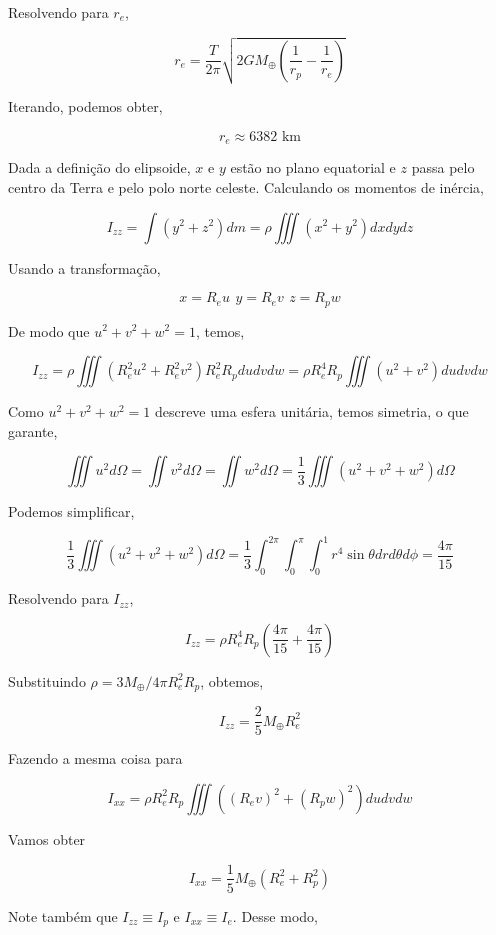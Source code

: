 \documentclass[11pt]{article}
\begin{document}
\begin{pproblem}
\begin{pssolution*}{}{}
\begin{alternativas}
            Resolvendo para \(r_e\), 

            \[r_e = \frac{T}{2\pi}\sqrt{2GM_\oplus\left(\frac{1}{r_p}-\frac{1}{r_e}\right)}\]

            Iterando, podemos obter, 

            \[r_e \approx 6382 \text{ km}\]

            \item Dada a definição do elipsoide, \(x\) e \(y\) estão no plano equatorial e \(z\) passa pelo centro da Terra e pelo polo norte celeste. Calculando os momentos de inércia, 
            
            \[I_{zz} = \int(y^2+z^2)dm = \rho \iiint (x^2+y^2)dxdydz\]

            Usando a transformação, 

            \[x = R_e u \, \ y = R_e v \, \ z = R_p w\]

            De modo que \(u^2+v^2+w^2=1\), temos, 

            \[I_{zz} = \rho\iiint (R_e^2u^2+R_e^2v^2) R_e^2R_pdudvdw = \rho R_e^4R_p \iiint (u^2+v^2)dudvdw\]

            Como \(u^2+v^2+w^2=1\) descreve uma esfera unitária, temos simetria, o que garante, 

            \[\iiint u^2d\Omega = \iint v^2d\Omega = \iint w^2d\Omega = \frac{1}{3}\iiint(u^2+v^2+w^2)d\Omega\]

            Podemos simplificar, 

            \[\frac{1}{3}\iiint(u^2+v^2+w^2)d\Omega = \frac{1}{3}\int_0^{2\pi}\int_{0}^{\pi}\int_0^1 r^4\sin\theta drd\theta d\phi = \frac{4\pi}{15}\]

            Resolvendo para \(I_{zz}\), 

            \[I_{zz} = \rho R_e^4 R_p \left(\frac{4\pi}{15}+\frac{4\pi}{15}\right)\]

            Substituindo \(\rho = 3M_\oplus/4\pi R_e^2R_p\), obtemos, 

            \[I_{zz} = \frac{2}{5}M_\oplus R_e^2\]

            Fazendo a mesma coisa para 

            \[I_{xx} = \rho R_e^2R_p\iiint ((R_ev)^2+(R_pw)^2)dudvdw\]

            Vamos obter 

            \[I_{xx} = \frac{1}{5}M_\oplus(R_e^2+R_p^2)\]

            Note também que \(I_{zz} \equiv I_p\) e \(I_{xx}\equiv I_e\). Desse modo, 


\end{alternativas}
\end{pssolution*}
\end{pproblem}
\end{document}
